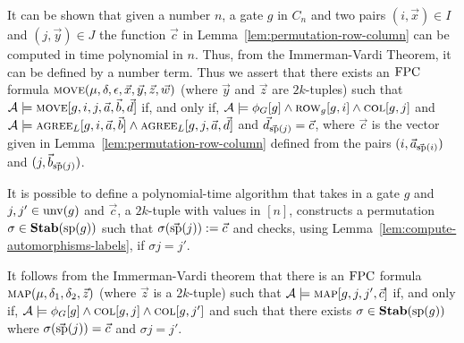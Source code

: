 \documentclass[../main/thesis.tex]{subfiles}
\begin{document}
It can be shown that given a number $n$, a gate $g$ in $C_n$ and two pairs $(i,
\vec{x}) \in I$ and $(j, \vec{y}) \in J$ the function $\vec{c}$ in
Lemma~\ref{lem:permutation-row-column} can be computed in time polynomial in
$n$. Thus, from the Immerman-Vardi Theorem, it can be defined by a number term.
Thus we assert that there exists an $\text{\upshape FPC}$ formula $\textsc{move} (\mu, \delta,
\epsilon, \vec{x}, \vec{y}, \vec{z}, \vec{w})$ (where $\vec{y}$ and $\vec{z}$
are $2k$-tuples) such that $\mathcal{A} \models \textsc{move} [g, i, j, \vec{a},
\vec{b}, \vec{d}]$ if, and only if, $\mathcal{A} \models \phi_G [g] \land
\textsc{row}_g[g,i] \land \textsc{col}[g, j]$ and $\mathcal{A} \models \textsc{agree}_L [g,
i, \vec{a}, \vec{b}] \land \textsc{agree}_L [g, j, \vec{a}, \vec{d}]$ and
$\vec{d}_{\vec{\text{sp}}(j)} = \vec{c}$, where $\vec{c}$ is the vector given in
Lemma~\ref{lem:permutation-row-column} defined from the pairs $(i,
\vec{a}_{\vec{\text{sp}}(i)})$ and $(j, \vec{b}_{\vec{\text{sp}}(j)})$.

It is possible to define a polynomial-time algorithm that takes in a gate $g$
and $j, j' \in \text{unv}(g)$ and $\vec{c}$, a $2k$-tuple with values in $[n]$,
constructs a permutation $\sigma \in \text{\textbf{Stab}} (\text{sp} (g))$ such that $\sigma
(\vec{\text{sp}}(j)) := \vec{c}$ and checks, using
Lemma~\ref{lem:compute-automorphisms-labels}, if $\sigma j = j'$.

It follows from the Immerman-Vardi theorem that there is an $\text{\upshape FPC}$ formula
$\textsc{map}(\mu, \delta_1, \delta_2, \vec{z})$ (where $\vec{z}$ is a $2k$-tuple)
such that $\mathcal{A} \models \textsc{map}[g, j, j', \vec{c}]$ if, and only if,
$\mathcal{A} \models \phi_G [g] \land \textsc{col}[g, j] \land \textsc{col}[g, j']$ and
such that there exists $\sigma \in \text{\textbf{Stab}} (\text{sp} (g))$ where $\sigma (\vec{\text{sp}}(j)) =
\vec{c}$ and $\sigma j = j'$.
				
\end{document}
